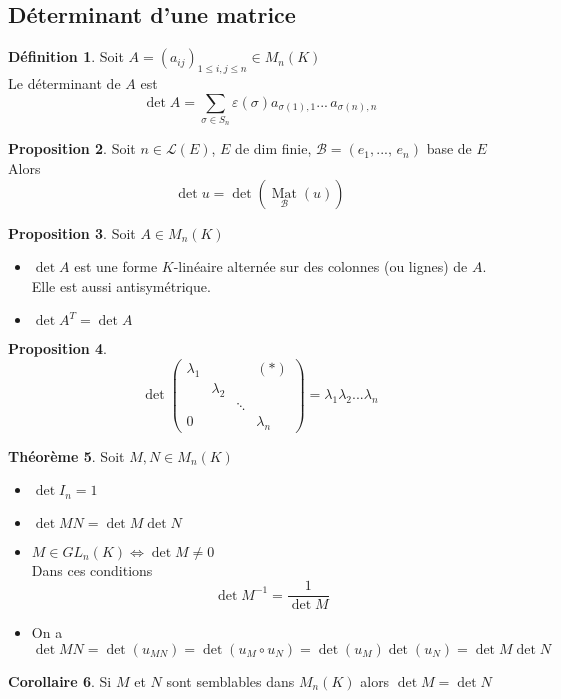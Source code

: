 \documentclass[10pt,a4paper]{article}
\theoremstyle{definition}
\newtheorem{proposition}{Proposition}[section]
\newtheorem{theorem}[proposition]{Théorème}
\newtheorem{corollaire}[proposition]{Corollaire}
\newtheorem{definition}[proposition]{Définition}
\DeclareMathOperator*{\mat}{Mat}
\begin{document}
\subsection{Déterminant d'une matrice}
\begin{definition}
Soit $A = (a_{ij})_{1 \leq i, j \leq n} \in M_n(K)$ \\
Le déterminant de $A$ est 
\[ \det A = \sum_{\sigma \in S_n} \varepsilon(\sigma) a_{\sigma(1), 1} ...\, a_{\sigma(n), n} \]
\end{definition}
\begin{proposition}
Soit $n \in \mathcal{L}(E)$, $E$ de dim finie, $\mathcal{B} = (e_1, ...,\, e_n)$ base de $E$ \\
Alors
\[ \det u = \det \left(\mat\limits_{\mathcal{B}}(u)\right) \]
\end{proposition}
\begin{proposition}
Soit $A \in M_n(K)$
\begin{itemize}
\item $\det A$ est une forme $K$-linéaire alternée sur des colonnes (ou lignes) de $A$. Elle est aussi antisymétrique.
\item $\det A^T = \det A$
\end{itemize}
\end{proposition}
\begin{proposition}
\[ \det \begin{pmatrix}
\lambda_1 & & & (*) \\
 & \lambda_2 & & \\
 & & \ddots & \\
0  & & & \lambda_n
\end{pmatrix} = \lambda_1 \lambda_2 ... \lambda_n \]
\end{proposition}
\begin{theorem}
Soit $M, N \in M_n(K)$
\begin{itemize}
\item $\det I_n = 1$
\item $\det M N = \det M \det N$
\item $M \in GL_n(K) \iff \det M \neq 0$ \\
Dans ces conditions
\[ \det M^{-1} = \frac{1}{\det M} \]
\item On a
\[ \det MN = \det(u_{MN}) = \det(u_M \circ u_N) = \det(u_M) \det(u_N) = \det M \det N \]
\end{itemize}
\end{theorem}
\begin{corollaire}
Si $M$ et $N$ sont semblables dans $M_n(K)$ alors $\det M = \det N$
\end{corollaire}
\end{document}
